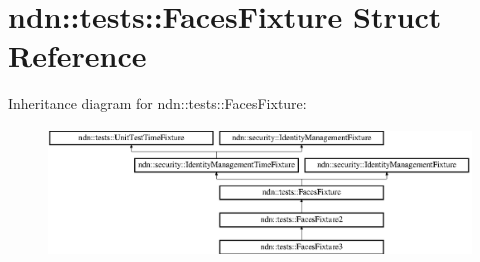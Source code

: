 \hypertarget{classndn_1_1tests_1_1FacesFixture}{}\section{ndn\+:\+:tests\+:\+:Faces\+Fixture Struct Reference}
\label{classndn_1_1tests_1_1FacesFixture}
Inheritance diagram for ndn\+:\+:tests\+:\+:Faces\+Fixture\+:\begin{figure}[H]
\begin{center}
\leavevmode
\includegraphics[height=3.393939cm]{classndn_1_1tests_1_1FacesFixture}
\end{center}
\end{figure}
